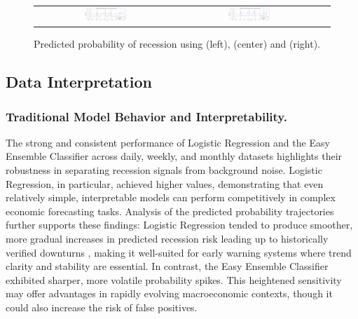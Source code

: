 \begin{figure}[H]
\begin{tabular}{c c c}
        \includegraphics[width=0.31\textwidth]{Steps/Plots/Monthly Predicted Probability of Recession Over Time using LSTM_8_4.png} &
        \includegraphics[width=0.31\textwidth]{Steps/Plots/Monthly Predicted Probability of Recession Over Time using LSTM_8_8.png} \\ [-9pt]
    \end{tabular}
    \caption{Predicted probability of recession %
    using \LSTMFF (left), \LSTMEF (center) and \LSTMEE (right).}
    \label{fig:table_lstm44_lstm84_lstm88}
\end{figure}

\vspace{-21pt}

\subsection{Data Interpretation}

\subsubsection{Traditional Model Behavior and Interpretability.}
The strong and consistent performance of Logistic Regression and the Easy Ensemble Classifier across daily, weekly, and monthly datasets highlights their robustness in separating recession signals from background noise. Logistic Regression, in particular, achieved higher \AUCone values, demonstrating that even relatively simple, interpretable models %
can perform competitively in complex economic forecasting tasks. Analysis of the predicted probability trajectories further supports these findings: Logistic Regression tended to produce smoother, more gradual increases in predicted recession risk leading up to historically verified downturns%
, making it well-suited for early warning systems where trend clarity and stability are essential. In contrast, the Easy Ensemble Classifier exhibited sharper, more volatile probability spikes. 
This heightened sensitivity may offer advantages in rapidly evolving macroeconomic contexts, though it could also increase the risk of false positives.




